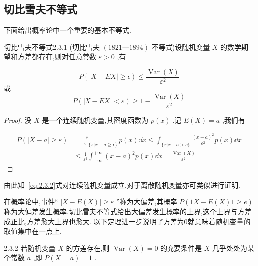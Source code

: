 \subsection{切比雪夫不等式}\label{sec:2.3.3}

下面给出概率论中一个重要的基本不等式.

\begin{theorem}{切比雪夫不等式}{2.3.1}
	(切比雪夫 $ (1821一1894) $ 不等式)设随机变量 $ X $ 的数学期望和方差都存在,则对任意常数 $ \varepsilon>0 $ ,有
	
	\begin{equation}
	P(|X-E X| \geqslant \epsilon) \leqslant \frac{\operatorname{Var}(X)}{\varepsilon^{2}} \label{eq:2.3.2}
	\end{equation}
	或
	\begin{equation}
	P(|X-E X|<\varepsilon) \geqslant 1-\frac{\operatorname{Var}(X)}{\varepsilon^{2}} \label{eq:2.3.3}
	\end{equation}
\end{theorem}

\begin{proof}
	没 $ X $ 是一个连续随机变量,其密度函数为 $ p(x) $ .记 $ E(X)=a $ ,我们有
	
	\[
	\begin{array}{ll}
	{P(|X-a| \geqslant \varepsilon)} & {=\int_{\{x | x-a \geq \epsilon\}} p(x) \dd x \leq \int_{\{x | x-a>c\}} \frac{(x-a)^{2}}{\varepsilon^{2}} p(x) \dd x} \\ 
	{} & {\leqslant \frac{1}{\varepsilon^{2}} \int_{-\infty}^{+\infty}(x-a)^{2} p(x) \dd x=\frac{\operatorname{Var}(X)}{\varepsilon^{2}}}
	\end{array}
	\] 
\end{proof}

由此知~\ref{eq:2.3.2}式对连续随机变量成立,对于离散随机变量亦可类似进行证明.

在概率论中,事件“ $ |X-E(X)| \geqslant \varepsilon $ ”称为大偏差,其概率 $ P(1X-E(X)1 \geqslant e) $ 称为大偏差发生概率.切比雪夫不等式给出大偏差发生概率的上界,这个上界与方差成正比,方差愈大上界也愈大.
以下定理进一步说明了方差为0就意味着随机变量的取值集中在一点上.

\begin{theorem}{}{2.3.2}
	若随机变量 $ X $ 的方差存在,则 $ \operatorname{Var}(X)=0 $ 的充要条件是 $ X $ 几乎处处为某个常数 $ a $ ,即 $ P(X=a)=1 $ .
\end{theorem}

